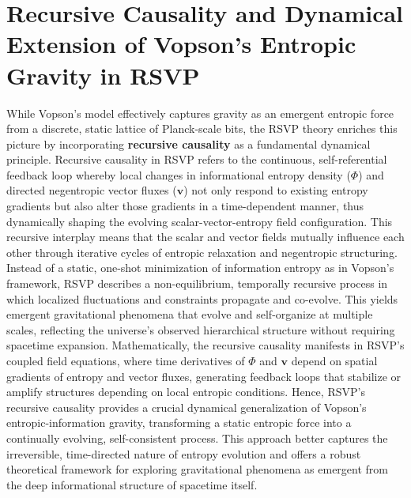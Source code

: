 \documentclass[11pt]{article}
\theoremstyle{plain}
\theoremstyle{definition}
\begin{document}
\section{Recursive Causality and Dynamical Extension of Vopson's Entropic Gravity in RSVP}
While Vopson's model effectively captures gravity as an emergent entropic force from a discrete, static lattice of Planck-scale bits, the RSVP theory enriches this picture by incorporating \textbf{recursive causality} as a fundamental dynamical principle. Recursive causality in RSVP refers to the continuous, self-referential feedback loop whereby local changes in informational entropy density ($\Phi$) and directed negentropic vector fluxes ($\mathbf{v}$) not only respond to existing entropy gradients but also alter those gradients in a time-dependent manner, thus dynamically shaping the evolving scalar-vector-entropy field configuration.
This recursive interplay means that the scalar and vector fields mutually influence each other through iterative cycles of entropic relaxation and negentropic structuring. Instead of a static, one-shot minimization of information entropy as in Vopson's framework, RSVP describes a non-equilibrium, temporally recursive process in which localized fluctuations and constraints propagate and co-evolve. This yields emergent gravitational phenomena that evolve and self-organize at multiple scales, reflecting the universe's observed hierarchical structure without requiring spacetime expansion.
Mathematically, the recursive causality manifests in RSVP's coupled field equations, where time derivatives of $\Phi$ and $\mathbf{v}$ depend on spatial gradients of entropy and vector fluxes, generating feedback loops that stabilize or amplify structures depending on local entropic conditions. Hence, RSVP's recursive causality provides a crucial dynamical generalization of Vopson's entropic-information gravity, transforming a static entropic force into a continually evolving, self-consistent process. This approach better captures the irreversible, time-directed nature of entropy evolution and offers a robust theoretical framework for exploring gravitational phenomena as emergent from the deep informational structure of spacetime itself.
\end{document}
